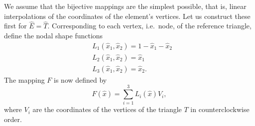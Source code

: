 \documentclass[english, 12pt, a4paper, sci, utf8, a-2b, online]{aaltothesis}
\theoremstyle{definition}
\theoremstyle{plain}
\numberwithin{equation}{section}
\begin{document}
\begin{figure}[t]
\centering
    \begin{minipage}{.5\textwidth}
        \centering
        \label{fig:reference_triangle}
    \end{minipage}%
    \begin{minipage}{.5\textwidth}
        \centering
        \label{fig:reference_quad}
    \end{minipage}
\end{figure}

We assume that the bijective mappings are the simplest possible,
that is, linear interpolations of the coordinates of the element's vertices.
Let us construct these first for $\widehat{E} = \widehat{T}$.
Corresponding to each vertex, i.e.\ node, of the reference triangle,
define the nodal shape functions
\begin{align}
    \label{eq:tri_nodal_shape_start}
    &L_1(\hat{x}_1,\hat{x}_2) = 1 - \widehat{x}_1 - \widehat{x}_2 \\[0.5em]
    &L_2(\hat{x}_1,\hat{x}_2) = \widehat{x}_1 \\[0.5em]
    \label{eq:tri_nodal_shape_end}
    &L_3(\hat{x}_1,\hat{x}_2) = \widehat{x}_2.
\end{align}
The mapping $F$ is now defined by
\begin{equation}
    \label{eq:tri_element_map}
    F(\hat{x}) = \sum_{i=1}^{3} L_i(\hat{x}) V_i,
\end{equation}
where $V_i$ are the coordinates of the vertices of the triangle $T$
in counterclockwise order.
\end{document}
